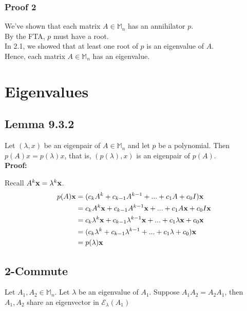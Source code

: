\documentclass[12pt, letterpaper]{article}
\begin{document}
\subsubsection{Proof 2}
We've shown that each matrix $A \in \mathbb{M}_n$ has an annihilator $p$. \\
By the FTA, $p$ must have a root. \\
In 2.1, we showed that at least one root of $p$ is an eigenvalue of $A$. \\
Hence, each matrix $A \in \mathbb{M}_n$ has an eigenvalue. 

\section{Eigenvalues}
\subsection{Lemma 9.3.2}
Let $(\lambda,x)$ be an eigenpair of $A\in \mathbb{M}_n$ and let $p$ be a polynomial.
Then $p(A)x=p(\lambda)x$, that is, $(p(\lambda),x)$ is an eigenpair of $p(A)$. \\

\noindent \textbf{Proof:} 

Recall $A^k\textbf x = \lambda^k \textbf x$.
\begin{align*}
    p(A)\textbf x &= (c_k A^k + c_{k-1} A^{k-1} + ... + c_1A + c_0I)\textbf x \\
    &= c_k A^k \textbf x + c_{k-1} A^{k-1} \textbf x+ ... + c_1A \textbf x + c_0I\textbf x \\
    &= c_k \lambda^k \textbf x + c_{k-1} \lambda^{k-1} \textbf x+ ... + c_1\lambda \textbf x + c_0\textbf x \\
    &= (c_k \lambda^k + c_{k-1} \lambda^{k-1} + ... + c_1\lambda + c_0)\textbf x \\
    &= p(\lambda)\textbf x 
\end{align*}

\subsection{2-Commute}
Let $A_1, A_2 \in \mathbb{M}_n$. Let $\lambda$ be an eigenvalue of $A_1$. Suppose $A_1A_2=A_2A_1$, then $A_1,A_2$ share an eigenvector in $\mathcal{E}_\lambda (A_1)$ \\
\end{document}
